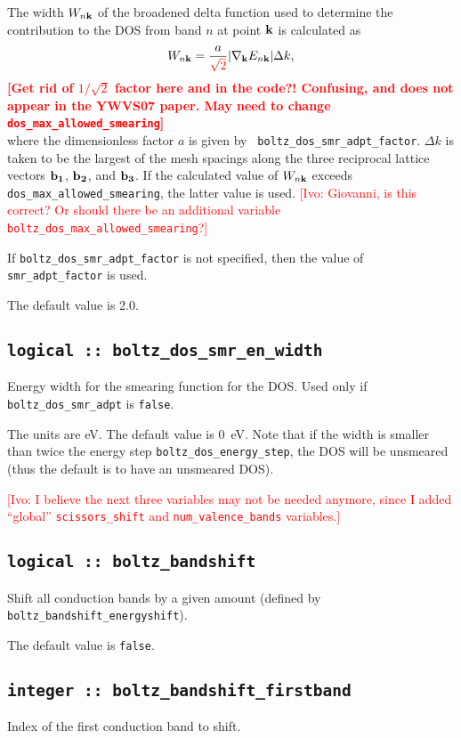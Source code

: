 The width $W_{n{\bf k}}$ of the broadened delta function used to
determine the contribution to the DOS from band $n$ at point ${\bf k}$
is calculated as
%
$$
W_{n{\bf k}}=\frac{a}{\textcolor{red}{\sqrt{2}}}\vert
\nabla_{\bf k} E_{n{\bf k}}\vert \Delta k,
$$ 
%
\textcolor{red}{{\bf [Get rid of $1/\sqrt{2}$ factor here and in the
    code?!  Confusing, and does not appear in the YWVS07 paper. May
    need to change
    {\tt dos\_max\_allowed\_smearing}]}}\\
where the dimensionless factor $a$ is given by {\tt
  boltz\_dos\_smr\_adpt\_factor}. $\Delta k$ is taken to be the
largest of the mesh spacings along the three reciprocal lattice
vectors ${\bf b_1}$, ${\bf b_2}$, and ${\bf b_3}$.  If the calculated
value of $W_{n{\bf k}}$ exceeds {\tt dos\_max\_allowed\_smearing}, the
latter value is used.  \textcolor{red}{[Ivo: Giovanni, is this correct? Or
  should there be an additional variable {\tt
    boltz\_dos\_max\_allowed\_smearing}?]}


If {\tt boltz\_dos\_smr\_adpt\_factor} is not specified, then the value of {\tt
  smr\_adpt\_factor} is used.  

The default value is 2.0.

\subsection[boltz\_dos\_smr\_en\_width]{\tt logical :: boltz\_dos\_smr\_en\_width}
Energy width for the smearing function for the DOS. Used only if {\tt boltz\_dos\_smr\_adpt} is \verb#false#.

The units are eV.
The default value is 0~eV. Note that if the width is smaller than twice the energy step {\tt boltz\_dos\_energy\_step}, the DOS will be unsmeared (thus the default is to have an unsmeared DOS).

\textcolor{red}{[Ivo: I believe the next three variables may not be
  needed anymore, since I added ``global'' {\tt scissors\_shift} and
  {\tt num\_valence\_bands} variables.]}

\subsection[boltz\_bandshift]{\tt logical :: boltz\_bandshift}
Shift all conduction bands by a given amount (defined by {\tt boltz\_bandshift\_energyshift}).

The default value is \verb#false#.

\subsection[boltz\_bandshift\_firstband]{\tt integer :: boltz\_bandshift\_firstband}
Index of the first conduction band to shift.


